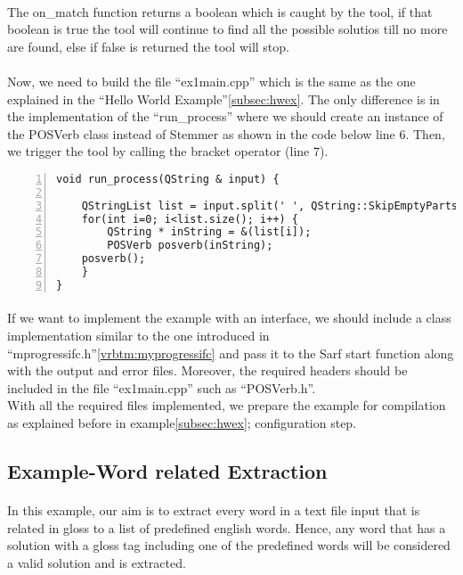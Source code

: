 \documentclass{article}
\begin{document}
\paragraph{}
The on\_match function returns a boolean which is caught by the tool, if that boolean is true the tool will continue to find all the possible solutios till no more are found, else if false is returned the tool will stop.

\paragraph{}
Now, we need to build the file ``ex1main.cpp'' which is the same as the one explained in the ``Hello World Example''\ref{subsec:hwex}. The only difference is in the implementation of the ``run\_process'' where we should create an instance of the POSVerb class instead of Stemmer as shown in the code below line 6. Then, we trigger the tool by calling the bracket operator (line 7).

\begin{Verbatim}[numbers=left]
void run_process(QString & input) {

    QStringList list = input.split(' ', QString::SkipEmptyParts);
    for(int i=0; i<list.size(); i++) {
        QString * inString = &(list[i]);
        POSVerb posverb(inString);
	posverb();
    }
}
\end{Verbatim}

\paragraph{}
If we want to implement the example with an interface, we should include a class implementation similar to the one introduced in ``mprogressifc.h''\ref{vrbtm:myprogressifc} and pass it to the Sarf start function along with the output and error files. Moreover, the required headers should be included in the file ``ex1main.cpp'' such as ``POSVerb.h''.\\
With all the required files implemented, we prepare the example for compilation as explained before in example\ref{subsec:hwex}; configuration step.

\subsection{Example-Word related Extraction}
\paragraph{}
In this example, our aim is to extract every word in a text file input that is related in gloss
to a list of predefined english words. Hence, any word that has a solution with a gloss tag including one of the predefined words will be considered a valid solution and is extracted.
\end{document}
